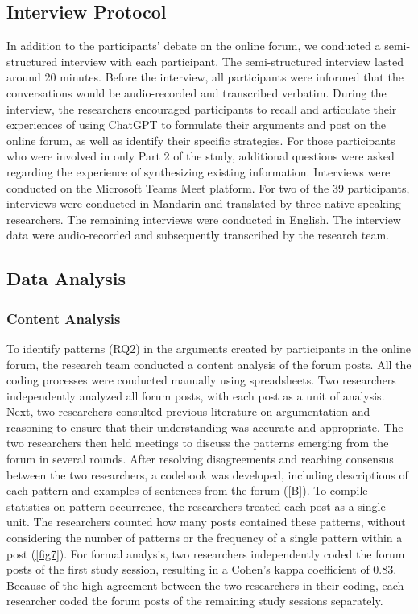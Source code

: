 \subsection{Interview Protocol}

In addition to the participants' debate on the online forum, we conducted a semi-structured interview with each participant. The semi-structured interview lasted around 20 minutes. Before the interview, all participants were informed that the conversations would be audio-recorded and transcribed verbatim. During the interview, the researchers encouraged participants to recall and articulate their experiences of using ChatGPT to formulate their arguments and post on the online forum, as well as identify their specific strategies. For those participants who were involved in only Part 2 of the study, additional questions were asked regarding the experience of synthesizing existing information. Interviews were conducted on the Microsoft Teams Meet platform. For two of the 39 participants, interviews were conducted in Mandarin and translated by three native-speaking researchers. The remaining interviews were conducted in English. The interview data were audio-recorded and subsequently transcribed by the research team.

\subsection{Data Analysis}

\subsubsection{Content Analysis}
To identify patterns (RQ2) in the arguments created by participants in the online forum, the research team conducted a content analysis of the forum posts. All the coding processes were conducted manually using spreadsheets. Two researchers independently analyzed all forum posts, with each post as a unit of analysis. Next, two researchers consulted previous literature on argumentation and reasoning to ensure that their understanding was accurate and appropriate. The two researchers then held meetings to discuss the patterns emerging from the forum in several rounds. After resolving disagreements and reaching consensus between the two researchers, a codebook was developed, including descriptions of each pattern and examples of sentences from the forum (\autoref{B}). To compile statistics on pattern occurrence, the researchers treated each post as a single unit. The researchers counted how many posts contained these patterns, without considering the number of patterns or the frequency of a single pattern within a post (\autoref{fig7}). For formal analysis, two researchers independently coded the forum posts of the first study session, resulting in a Cohen's kappa coefficient of 0.83. Because of the high agreement between the two researchers in their coding, each researcher coded the forum posts of the remaining study sessions separately.


